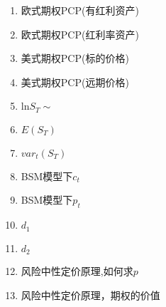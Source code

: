 \documentclass{article}
\begin{document}
\begin{enumerate}
    \item 欧式期权PCP(有红利资产)
    \item 欧式期权PCP(红利率资产)
    \item 美式期权PCP(标的价格)
    \item 美式期权PCP(远期价格)
    \item $\text{ln}S_T\sim$
    \item $E(S_T)$
    \item $var_t(S_T)$
    \item BSM模型下$c_t$
    \item BSM模型下$p_t$
    \item $d_1$
    \item $d_2$
    \item 风险中性定价原理,如何求$p$
    \item 风险中性定价原理，期权的价值
\end{enumerate}

\clearpage
\end{document}
